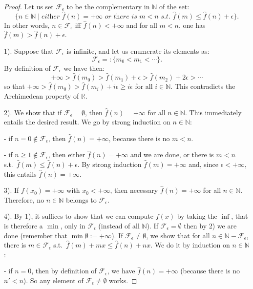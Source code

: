 \documentclass[submission,copyright,creativecommons]{eptcs}
\newcommand{\N}{\mathbb{N}}
\newcommand{\R}{\mathbb{R}}
\newcommand{\set}[1]{\{#1\}}
\begin{document}
\begin{proof}
Let us set $\mathcal F_\epsilon$ to be the complementary in $\N$ of the set:
\[
 \set{n\in\N \mid \textit{either } \hat f (n)=+\infty \textit{ or there is } m<n\textit{ s.t.\ } \hat f(m)\leq\hat f(n)+\epsilon}.
\]
In other words, $n\in\mathcal F_\epsilon$ iff $\hat f(n)<+\infty$ and for all $m<n$, one has $\hat f(m)>\hat f(n)+\epsilon$.

1).
Suppose that $\mathcal F_\epsilon$ is infinite, and let us enumerate its elements as:
\[\mathcal F_\epsilon =:\set{m_0<m_1<\cdots}.\]
By definition of $\mathcal F_\epsilon$ we have then:
\[+\infty>\hat f(m_0)>\hat f(m_1)+\epsilon>\hat f(m_2)+2\epsilon>\cdots\]
so that $+\infty>\hat f(m_0)>\hat f(m_{i})+i\epsilon\geq i\epsilon$ for all $i\in\N$.
This contradicts the Archimedean property of $\R$.

2).
We show that if $\mathcal F_\epsilon=\emptyset$, then $\hat f(n)=+\infty$ for all $n\in\N$.
This immediately entails the desired result.
We go by strong induction on $n\in\N$:

- if $n=0\notin\mathcal F_\epsilon$, then $\hat f(n)=+\infty$, because there is no $m<n$.

- if $n\geq 1\notin\mathcal F_\epsilon$, then either $\hat f(n)=+\infty$ and we are done, or there is $m<n$ s.t.\ $\hat f(m)\leq \hat f(n)+\epsilon$.
By strong induction $\hat f(m)=+\infty$ and, since $\epsilon<+\infty$, this entails $\hat f(n)=+\infty$.

3).
If $f(x_0)=+\infty$ with $x_0<+\infty$, then necessary $\hat f(n)=+\infty$ for all $n\in\N$.
Therefore, no $n\in\N$ belongs to $\mathcal F_\epsilon$.

4).
By 1), it suffices to show that we can compute $f(x)$ by taking the $\inf$, that is therefore a $\min$, only in $\mathcal F_\epsilon$ (instead of all $\N$).
If $\mathcal F_\epsilon=\emptyset$ then by 2) we are done (remember that $\min\emptyset := +\infty$).
If $\mathcal F_\epsilon\neq\emptyset$, we show that for all $n\in\N-\mathcal F_\epsilon$, there is $m\in\mathcal F_\epsilon$ s.t.\ $\hat f(m)+mx \leq \hat f(n)+nx$.
We do it by induction on $n\in\N$:

- if $n=0$, then by definition of $\mathcal F_\epsilon$, we have $\hat f(n)=+\infty$ (because there is no $n'<n$).
So any element of $\mathcal F_\epsilon\neq\emptyset$ works.


\end{proof}
\end{document}
